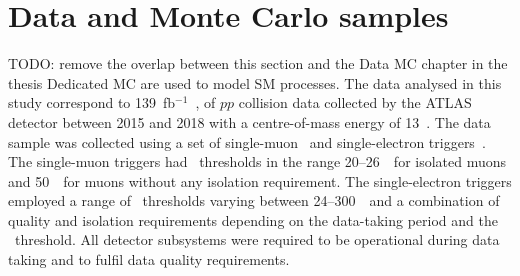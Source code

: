 \section{Data and Monte Carlo samples}
\label{sec:samples}
TODO: remove the overlap between this section and the Data MC chapter in the thesis
Dedicated MC are used to model SM processes. 
The data analysed in this study correspond to 139~fb$^{-1}$~\cite{DAPR-2010-01,DAPR-2011-01,DAPR-2013-01,LUCID2}, 
of \(pp\) collision data collected by the ATLAS detector between 2015 and 2018
with a centre-of-mass energy of 13~\TeV. 
The data sample was collected using a set of single-muon~\cite{Aad:2020uyd} 
and single-electron triggers~\cite{TRIG-2018-05}. The single-muon triggers 
had \pt\ thresholds in the range 20--26~\GeV\ for 
isolated muons and 50~\GeV\ for muons without any isolation requirement. 
The single-electron triggers employed a range of \pt\ thresholds 
varying between 24--300~\GeV\ 
and a combination of quality and isolation requirements depending on the 
data-taking period and the \pt\ threshold.
All detector subsystems were required to be operational
during data taking and to fulfil data quality requirements.  




